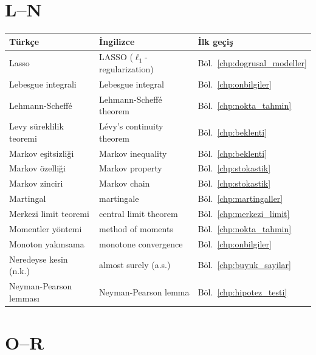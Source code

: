 \section{L--N}

\begin{tabular}{p{5cm}p{5cm}p{4cm}}
\hline
\textbf{Türkçe} & \textbf{İngilizce} & \textbf{İlk geçiş} \\
\hline
Lasso & LASSO ($\ell_1$-regularization) & Böl.~\ref{chp:dogrusal_modeller} \\
Lebesgue integrali & Lebesgue integral & Böl.~\ref{chp:onbilgiler} \\
Lehmann-Scheffé & Lehmann-Scheffé theorem & Böl.~\ref{chp:nokta_tahmin} \\
Levy süreklilik teoremi & Lévy's continuity theorem & Böl.~\ref{chp:beklenti} \\
Markov eşitsizliği & Markov inequality & Böl.~\ref{chp:beklenti} \\
Markov özelliği & Markov property & Böl.~\ref{chp:stokastik} \\
Markov zinciri & Markov chain & Böl.~\ref{chp:stokastik} \\
Martingal & martingale & Böl.~\ref{chp:martingaller} \\
Merkezi limit teoremi & central limit theorem & Böl.~\ref{chp:merkezi_limit} \\
Momentler yöntemi & method of moments & Böl.~\ref{chp:nokta_tahmin} \\
Monoton yakınsama & monotone convergence & Böl.~\ref{chp:onbilgiler} \\
Neredeyse kesin (n.k.) & almost surely (a.s.) & Böl.~\ref{chp:buyuk_sayilar} \\
Neyman-Pearson lemması & Neyman-Pearson lemma & Böl.~\ref{chp:hipotez_testi} \\
\hline
\end{tabular}

\section{O--R}

